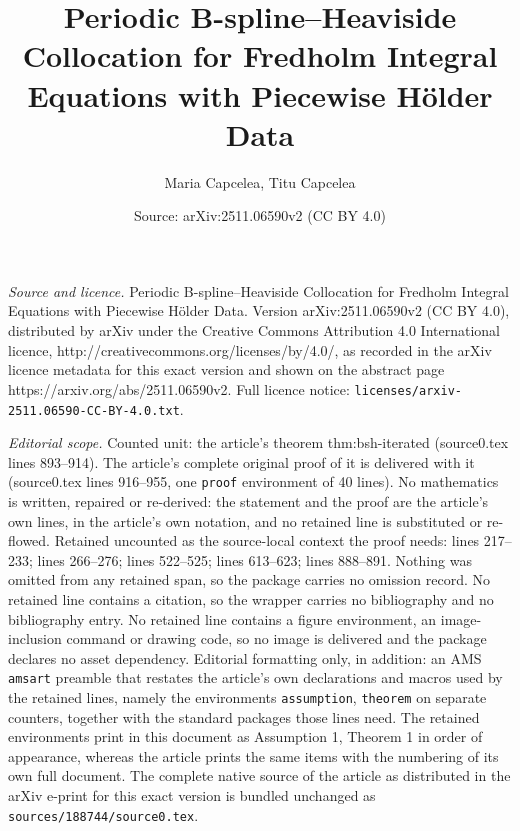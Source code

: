 \documentclass[10pt,a4paper]{amsart}
\title{Periodic B-spline--Heaviside Collocation for Fredholm Integral Equations with Piecewise H\"older Data}
\author{Maria Capcelea, Titu Capcelea}
\date{Source: arXiv:2511.06590v2 (CC BY 4.0)}
\begin{document}
\maketitle

\noindent\emph{Source and licence.} Periodic B-spline--Heaviside Collocation for Fredholm Integral Equations with Piecewise H\"older Data. Version arXiv:2511.06590v2 (CC BY 4.0), distributed by arXiv under the Creative Commons Attribution 4.0 International licence, http://creativecommons.org/licenses/by/4.0/, as recorded in the arXiv licence metadata for this exact version and shown on the abstract page https://arxiv.org/abs/2511.06590v2. Full licence notice: \texttt{licenses/arxiv-2511.06590-CC-BY-4.0.txt}.\par\smallskip

\noindent\textit{Editorial scope.} Counted unit: the article's theorem thm:bsh-iterated (source0.tex lines 893--914). The article's complete original proof of it is delivered with it (source0.tex lines 916--955, one \texttt{proof} environment of 40 lines). No mathematics is written, repaired or re-derived: the statement and the proof are the article's own lines, in the article's own notation, and no retained line is substituted or re-flowed.  Retained uncounted as the source-local context the proof needs: lines 217--233; lines 266--276; lines 522--525; lines 613--623; lines 888--891.  Nothing was omitted from any retained span, so the package carries no omission record.  No retained line contains a citation, so the wrapper carries no bibliography and no bibliography entry.  No retained line contains a figure environment, an image-inclusion command or drawing code, so no image is delivered and the package declares no asset dependency.  Editorial formatting only, in addition: an AMS \texttt{amsart} preamble that restates the article's own declarations and macros used by the retained lines, namely the environments \texttt{assumption}, \texttt{theorem} on separate counters, together with the standard packages those lines need.  The retained environments print in this document as Assumption 1, Theorem 1 in order of appearance, whereas the article prints the same items with the numbering of its own full document.  The complete native source of the article as distributed in the arXiv e-print for this exact version is bundled unchanged as \texttt{sources/188744/source0.tex}.
\end{document}
